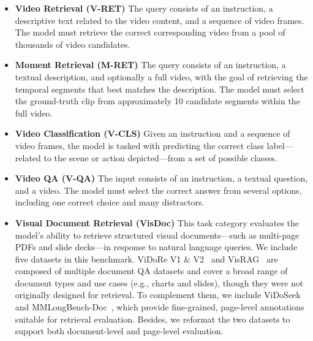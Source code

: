 \begin{itemize}[
    itemsep=0pt,        %
    parsep=0pt,         %
    topsep=0pt,         %
    leftmargin=1em      %
]
    \item \textbf{Video Retrieval (V-RET)} The query consists of an instruction, a descriptive text related to the video content, and a sequence of video frames. The model must retrieve the correct corresponding video from a pool of thousands of video candidates.
    \item \textbf{Moment Retrieval (M-RET)} The query consists of an instruction, a textual description, and optionally a full video, with the goal of retrieving the temporal segments that best matches the description. The model must select the ground-truth clip from approximately 10 candidate segments within the full video.
    \item \textbf{Video Classification (V-CLS)} Given an instruction and a sequence of video frames, the model is tasked with predicting the correct class label—related to the scene or action depicted—from a set of possible classes.
    \item \textbf{Video QA (V-QA)} The input consists of an instruction, a textual question, and a video. The model must select the correct answer from several options, including one correct choice and many distractors.
    \item \textbf{Visual Document Retrieval (VisDoc)} This task category evaluates the model’s ability to retrieve structured visual documents—such as multi-page PDFs and slide decks—in response to natural language queries. We include five datasets in this benchmark. ViDoRe V1 \& V2~\citep{colpali, vidore_v2} and VisRAG~\citep{visrag} are composed of multiple document QA datasets and cover a broad range of document types and use cases (e.g., charts and slides), though they were not originally designed for retrieval. To complement them, we include ViDoSeek~\citep{vidorag} and MMLongBench-Doc~\citep{mmlongbench}, which provide fine-grained, page-level annotations suitable for retrieval evaluation. Besides, we reformat the two datasets to support both document-level and page-level evaluation.
\end{itemize}

